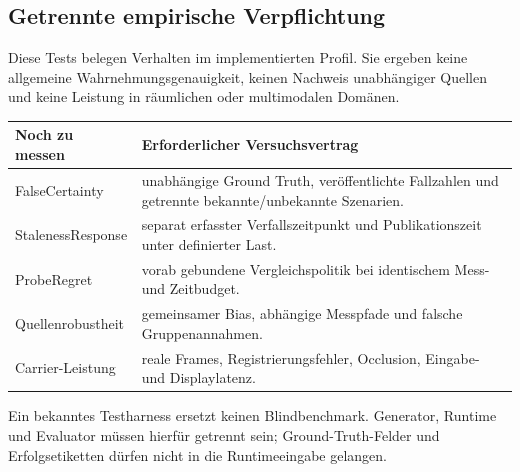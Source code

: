 \documentclass[11pt,a4paper]{article}
\begin{document}
\subsection{Getrennte empirische Verpflichtung}
Diese Tests belegen Verhalten im implementierten Profil.
Sie ergeben keine allgemeine Wahrnehmungsgenauigkeit,
keinen Nachweis unabhängiger Quellen und keine Leistung
in räumlichen oder multimodalen Domänen.

\begin{tabularx}{\linewidth}{@{}lY@{}}
\toprule
Noch zu messen & Erforderlicher Versuchsvertrag\\\midrule
FalseCertainty & unabhängige Ground Truth, veröffentlichte Fallzahlen
und getrennte bekannte/unbekannte Szenarien.\\
StalenessResponse & separat erfasster Verfallszeitpunkt und
Publikationszeit unter definierter Last.\\
ProbeRegret & vorab gebundene Vergleichspolitik bei identischem
Mess- und Zeitbudget.\\
Quellenrobustheit & gemeinsamer Bias, abhängige Messpfade und
falsche Gruppenannahmen.\\
Carrier-Leistung & reale Frames, Registrierungsfehler,
Occlusion, Eingabe- und Displaylatenz.\\
\bottomrule
\end{tabularx}

Ein bekanntes Testharness ersetzt keinen Blindbenchmark.
Generator, Runtime und Evaluator müssen hierfür getrennt sein;
Ground-Truth-Felder und Erfolgsetiketten dürfen nicht in die
Runtimeeingabe gelangen.
\end{document}
